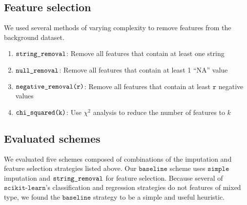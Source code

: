 \documentclass{article} %
\begin{document}
\subsection{Feature selection}
\label{sec:featureselection}

We used several methods of varying complexity to remove features from the background dataset.

\begin{enumerate}
  \item $\texttt{string\textunderscore removal}$: Remove all features that contain at least one string
  \item $\texttt{null\textunderscore removal}$: Remove all features that contain at least 1 ``NA'' value
  \item $\texttt{negative\textunderscore removal(r)}$: Remove all features that contain at least $\texttt{r}$ negative values
  \item $\texttt{chi\textunderscore squared(k)}$: Use $\chi^2$ analysis to reduce the number of features to $k$
\end{enumerate}




\subsection{Evaluated schemes}
\label{sec:evaluatedschemes}

We evaluated five schemes composed of combinations of the imputation and feature selection strategies listed above. Our $\texttt{baseline}$ scheme uses $\texttt{simple}$ imputation and $\texttt{string\textunderscore removal}$ for feature selection. Because several of $\texttt{scikit-learn}$'s classification and regression strategies do not features of mixed type, we found the $\texttt{baseline}$ strategy to be a simple and useful heuristic.
\end{document}
